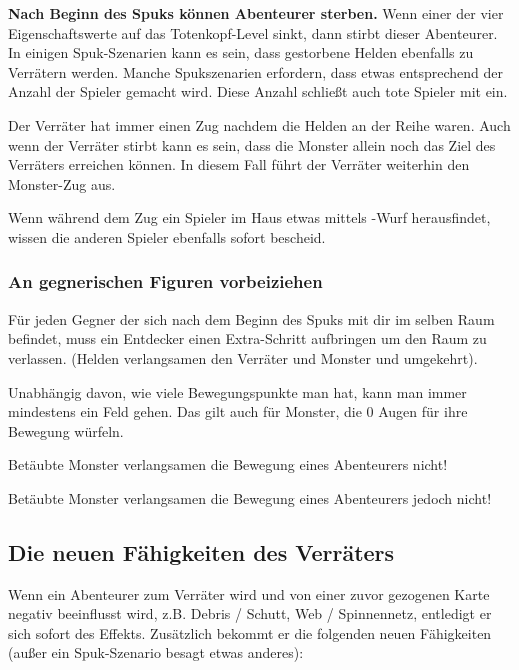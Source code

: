 \textbf{Nach Beginn des Spuks können Abenteurer sterben.} Wenn einer der vier Eigenschaftswerte auf das Totenkopf-Level sinkt, dann stirbt dieser Abenteurer. In einigen Spuk-Szenarien kann es sein, dass gestorbene Helden ebenfalls zu Verrätern werden. Manche Spukszenarien erfordern, dass etwas entsprechend der Anzahl der Spieler gemacht wird. Diese Anzahl schließt auch tote Spieler mit ein.

Der Verräter hat immer einen Zug nachdem die Helden an der Reihe waren. Auch wenn der Verräter stirbt kann es sein, dass die Monster allein noch das Ziel des Verräters erreichen können. In diesem Fall führt der Verräter weiterhin den Monster-Zug aus.

Wenn während dem Zug ein Spieler im Haus etwas mittels \know-Wurf herausfindet, wissen die anderen Spieler ebenfalls sofort bescheid.

\subsubsection{An gegnerischen Figuren vorbeiziehen}

Für jeden Gegner der sich nach dem Beginn des Spuks mit dir im selben Raum befindet, muss ein Entdecker einen Extra-Schritt aufbringen um den Raum zu verlassen. (Helden verlangsamen den Verräter und Monster und umgekehrt).

Unabhängig davon, wie viele Bewegungspunkte man hat, kann man immer mindestens ein Feld gehen. Das gilt auch für Monster, die 0 Augen für ihre Bewegung würfeln.

Betäubte Monster verlangsamen die Bewegung eines Abenteurers nicht!


Betäubte Monster verlangsamen die Bewegung eines Abenteurers jedoch nicht!

\subsection{Die neuen Fähigkeiten des Verräters}
\label{kap:rule:newtraitorpowers}

Wenn ein Abenteurer zum Verräter wird und von einer zuvor gezogenen Karte negativ beeinflusst wird, z.B. Debris / Schutt, Web / Spinnennetz, entledigt er sich sofort des Effekts. Zusätzlich bekommt er die folgenden neuen Fähigkeiten (außer ein Spuk-Szenario besagt etwas anderes):

